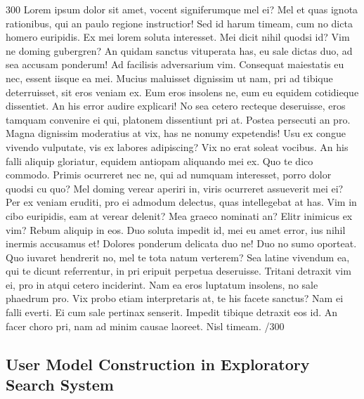 \documentclass{sigchi}
\begin{document}
300 Lorem ipsum dolor sit amet, vocent signiferumque mel ei? Mel et quas ignota rationibus, qui an paulo regione instructior! Sed id harum timeam, cum no dicta homero euripidis. Ex mei lorem soluta interesset. Mei dicit nihil quodsi id? Vim ne doming gubergren? An quidam sanctus vituperata has, eu sale dictas duo, ad sea accusam ponderum! Ad facilisis adversarium vim. Consequat maiestatis eu nec, essent iisque ea mei. Mucius maluisset dignissim ut nam, pri ad tibique deterruisset, sit eros veniam ex. Eum eros insolens ne, eum eu equidem cotidieque dissentiet. An his error audire explicari! No sea cetero recteque deseruisse, eros tamquam convenire ei qui, platonem dissentiunt pri at. Postea persecuti an pro. Magna dignissim moderatius at vix, has ne nonumy expetendis! Usu ex congue vivendo vulputate, vis ex labores adipiscing? Vix no erat soleat vocibus. An his falli aliquip gloriatur, equidem antiopam aliquando mei ex. Quo te dico commodo. Primis ocurreret nec ne, qui ad numquam interesset, porro dolor quodsi cu quo? Mel doming verear aperiri in, viris ocurreret assueverit mei ei? Per ex veniam eruditi, pro ei admodum delectus, quas intellegebat at has. Vim in cibo euripidis, eam at verear delenit? Mea graeco nominati an? Elitr inimicus ex vim? Rebum aliquip in eos. Duo soluta impedit id, mei eu amet error, ius nihil inermis accusamus et! Dolores ponderum delicata duo ne! Duo no sumo oporteat. Quo iuvaret hendrerit no, mel te tota natum verterem? Sea latine vivendum ea, qui te dicunt referrentur, in pri eripuit perpetua deseruisse. Tritani detraxit vim ei, pro in atqui cetero inciderint. Nam ea eros luptatum insolens, no sale phaedrum pro. Vix probo etiam interpretaris at, te his facete sanctus? Nam ei falli everti. Ei cum sale pertinax senserit. Impedit tibique detraxit eos id. An facer choro pri, nam ad minim causae laoreet. Nisl timeam. /300

\subsection{User Model Construction in Exploratory Search System}
\end{document}
